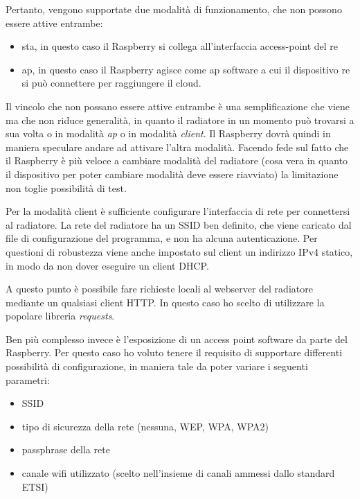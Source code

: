 \documentclass[12pt,a4paper,twoside,titlepage]{book}
\begin{document}
Pertanto, vengono supportate due modalità di funzionamento, che non possono essere
attive entrambe:
\begin{itemize}
    \item \acrshort{sta}, in questo caso il Raspberry si collega all'interfaccia
        access-point del \Gls{re}
    \item \acrshort{ap}, in questo caso il Raspberry agisce come \acrshort{ap} software
        a cui il dispositivo \Gls{re} si può connettere per raggiungere il
        cloud.
\end{itemize}

Il vincolo che non possano essere attive entrambe è una semplificazione che viene ma che
non riduce generalità, in quanto il radiatore in un momento può trovarsi a sua volta o in
modalità \textit{ap} o in modalità \textit{client}. Il Raspberry dovrà quindi in maniera
speculare andare ad attivare l'altra modalità. Facendo fede sul fatto che il Raspberry è
più veloce a cambiare modalità del radiatore (cosa vera in quanto il dispositivo per poter
cambiare modalità deve essere riavviato) la limitazione non toglie possibilità di test.

Per la modalità client è sufficiente configurare l'interfaccia di rete per connettersi
al radiatore. La rete del radiatore ha un SSID ben definito, che viene caricato dal
file di configurazione del programma, e non ha alcuna autenticazione. Per questioni
di robustezza viene anche impostato sul client un indirizzo IPv4 statico, in modo da
non dover eseguire un client DHCP.

A questo punto è possibile fare richieste locali al webserver del radiatore mediante
un qualsiasi client HTTP. In questo caso ho scelto di utilizzare la popolare
libreria \textit{requests}.

Ben più complesso invece è l'esposizione di un access point software da parte del
Raspberry. Per questo caso ho voluto tenere il requisito di supportare differenti
possibilità di configurazione, in maniera tale da poter variare i seguenti parametri:
\begin{itemize}
    \item SSID
    \item tipo di sicurezza della rete (nessuna, WEP, WPA, WPA2)
    \item passphrase della rete
    \item canale \Gls{wifi} utilizzato (scelto nell'insieme di canali ammessi dallo standard ETSI)
\end{itemize}
\end{document}
